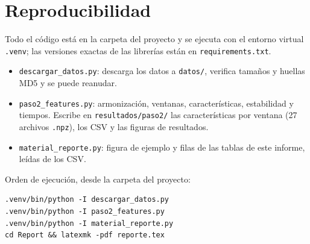 \documentclass[11pt,a4paper]{article}
\begin{document}
\FloatBarrier
\section{Reproducibilidad}
Todo el código está en la carpeta del proyecto y se ejecuta con el entorno virtual \texttt{.venv}; las versiones exactas de las librerías están en \texttt{requirements.txt}.
\begin{itemize}
  \item \texttt{descargar\_datos.py}: descarga los datos a \texttt{datos/}, verifica tamaños y huellas MD5 y se puede reanudar.
  \item \texttt{paso2\_features.py}: armonización, ventanas, características, estabilidad y tiempos. Escribe en \texttt{resultados/paso2/} las características por ventana (27 archivos \texttt{.npz}), los CSV y las figuras de resultados.
  \item \texttt{material\_reporte.py}: figura de ejemplo y filas de las tablas de este informe, leídas de los CSV.
\end{itemize}
Orden de ejecución, desde la carpeta del proyecto:
\begin{verbatim}
.venv/bin/python -I descargar_datos.py
.venv/bin/python -I paso2_features.py
.venv/bin/python -I material_reporte.py
cd Report && latexmk -pdf reporte.tex
\end{verbatim}
\end{document}
